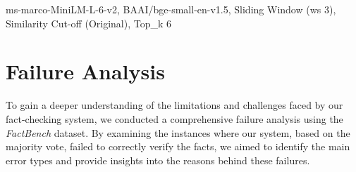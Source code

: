 \begin{table}
    \noindent
    \caption{Performance evaluation of various models on the FactBench dataset.}
    {\scriptsize ms-marco-MiniLM-L-6-v2, BAAI/bge-small-en-v1.5, Sliding Window (ws 3), Similarity Cut-off (Original), Top\_k 6}
    \label{tab:evaluation_results-full-wo-category}
\end{table}

%

\section{Failure Analysis}\label{sec:faiure-analysis}
To gain a deeper understanding of the limitations and challenges faced by our fact-checking system, we conducted a comprehensive failure analysis using the \textit{FactBench} dataset.
By examining the instances where our system, based on the majority vote, failed to correctly verify the facts, we aimed to identify the main error types and provide insights into the reasons behind these failures.
